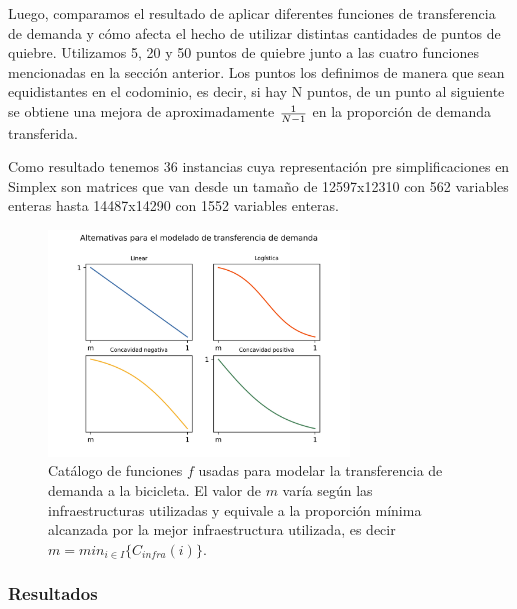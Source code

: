 \documentclass{article}
\begin{document}
  Luego, comparamos el resultado de aplicar diferentes funciones de transferencia de demanda y cómo afecta el hecho de utilizar distintas cantidades de puntos de quiebre. Utilizamos 5, 20 y 50 puntos de quiebre junto a las cuatro funciones mencionadas en la sección anterior. Los puntos los definimos de manera que sean equidistantes en el codominio, es decir, si hay N puntos, de un punto al siguiente se obtiene una mejora de aproximadamente ${1 \over N - 1}$ en la proporción de demanda transferida.

  Como resultado tenemos 36 instancias cuya representación pre simplificaciones en Simplex son matrices que van desde un tamaño de 12597x12310 con 562 variables enteras hasta 14487x14290 con 1552 variables enteras.

  \begin{figure}[h!]
    \centering
    \includegraphics[width=8cm]{../resources/f_catalog.png}
      \caption{Catálogo de funciones $f$ usadas para modelar la transferencia de demanda a la bicicleta. El valor de $m$ varía según las infraestructuras utilizadas y equivale a la proporción mínima alcanzada por la mejor infraestructura utilizada, es decir $m = min_{i \in I} \{ C_{infra}(i) \}$.}
    \label{fig:fcatalog}
  \end{figure}

  \FloatBarrier
  \subsubsection{Resultados}
\end{document}

